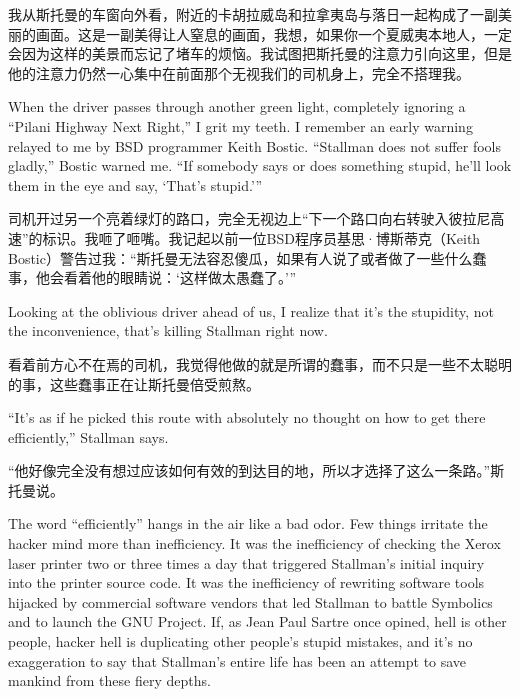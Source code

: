 \ifdefined\chs
我从斯托曼的车窗向外看，附近的卡胡拉威岛和拉拿夷岛与落日一起构成了一副美丽的画面。这是一副美得让人窒息的画面，我想，如果你一个夏威夷本地人，一定会因为这样的美景而忘记了堵车的烦恼。我试图把斯托曼的注意力引向这里，但是他的注意力仍然一心集中在前面那个无视我们的司机身上，完全不搭理我。
\fi

\ifdefined\eng
When the driver passes through another green light, completely ignoring a ``Pilani Highway Next Right,'' I grit my teeth. I remember an early warning relayed to me by BSD programmer Keith Bostic. ``Stallman does not suffer fools gladly,'' Bostic warned me. ``If somebody says or does something stupid, he'll look them in the eye and say, `That's stupid.'\hspace{0.01in}''
\fi

\ifdefined\chs
司机开过另一个亮着绿灯的路口，完全无视边上``下一个路口向右转驶入彼拉尼高速''的标识。我咂了咂嘴。我记起以前一位BSD程序员基思·博斯蒂克（Keith Bostic）警告过我：``斯托曼无法容忍傻瓜，如果有人说了或者做了一些什么蠢事，他会看着他的眼睛说：`这样做太愚蠢了。'\hspace{0.01in}''
\fi

\ifdefined\eng
Looking at the oblivious driver ahead of us, I realize that it's the stupidity, not the inconvenience, that's killing Stallman right now.
\fi

\ifdefined\chs
看着前方心不在焉的司机，我觉得他做的就是所谓的蠢事，而不只是一些不太聪明的事，这些蠢事正在让斯托曼倍受煎熬。
\fi

\ifdefined\eng
``It's as if he picked this route with absolutely no thought on how to get there efficiently,'' Stallman says.
\fi

\ifdefined\chs
``他好像完全没有想过应该如何有效的到达目的地，所以才选择了这么一条路。''斯托曼说。
\fi

\ifdefined\eng
The word ``efficiently'' hangs in the air like a bad odor. Few things irritate the hacker mind more than inefficiency. It was the inefficiency of checking the Xerox laser printer two or three times a day that triggered Stallman's initial inquiry into the printer source code. It was the inefficiency of rewriting software tools hijacked by commercial software vendors that led Stallman to battle Symbolics and to launch the GNU Project. If, as Jean Paul Sartre once opined, hell is other people, hacker hell is duplicating other people's stupid mistakes, and it's no exaggeration to say that Stallman's entire life has been an attempt to save mankind from these fiery depths.
\fi

